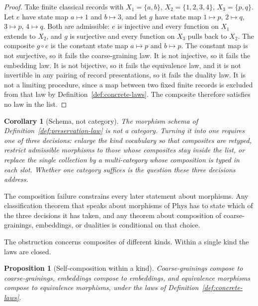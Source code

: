 \documentclass[11pt,letterpaper]{article}
\newtheorem{proposition}[theorem]{Proposition}
\newtheorem{corollary}[theorem]{Corollary}
\theoremstyle{definition}
\theoremstyle{remark}
\begin{document}
\begin{proof}
Take finite classical records with $X_1 = \{a, b\}$, $X_2 = \{1, 2, 3, 4\}$, $X_3 = \{p, q\}$. Let $e$ have state map $a \mapsto 1$ and $b \mapsto 3$, and let $g$ have state map $1 \mapsto p$, $2 \mapsto q$, $3 \mapsto p$, $4 \mapsto q$. Both are admissible: $e$ is injective and every function on $X_1$ extends to $X_2$, and $g$ is surjective and every function on $X_3$ pulls back to $X_2$. The composite $g \circ e$ is the constant state map $a \mapsto p$ and $b \mapsto p$. The constant map is not surjective, so it fails the coarse-graining law. It is not injective, so it fails the embedding law. It is not bijective, so it fails the equivalence law, and it is not invertible in any pairing of record presentations, so it fails the duality law. It is not a limiting procedure, since a map between two fixed finite records is excluded from that law by Definition~\ref{def:concrete-laws}. The composite therefore satisfies no law in the list.
\end{proof}

\begin{corollary}[Schema, not category]
\label{cor:schema-not-category}
The morphism schema of Definition~\ref{def:preservation-law} is not a category. Turning it into one requires one of three decisions: enlarge the kind vocabulary so that composites are retyped, restrict admissible morphisms to those whose composites stay inside the list, or replace the single collection by a multi-category whose composition is typed in each slot. Whether one category suffices is the question these three decisions address.
\end{corollary}

The composition failure constrains every later statement about morphisms. Any classification theorem that speaks about morphisms of $\mathrm{Phys}$ has to state which of the three decisions it has taken, and any theorem about composition of coarse-grainings, embeddings, or dualities is conditional on that choice.

The obstruction concerns composites of different kinds. Within a single kind the laws are closed.

\begin{proposition}[Self-composition within a kind]
\label{prop:self-composition}
Coarse-grainings compose to coarse-grainings, embeddings compose to embeddings, and equivalence morphisms compose to equivalence morphisms, under the laws of Definition~\ref{def:concrete-laws}.
\end{proposition}
\end{document}
